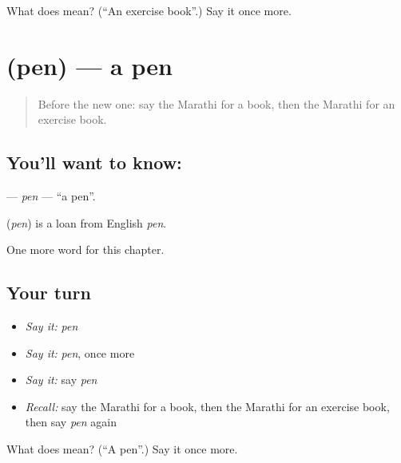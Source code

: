 \begin{tcolorbox}[breakable,colback=teal!4,colframe=teal!35!black,title={Before you move on}]
What does  mean? (\textquotedblleft{}An exercise book\textquotedblright{}.) Say it once more.
\end{tcolorbox}
\section[\texorpdfstring{\mr{पेन} (pen)}{पेन (pen)}]{ (pen) — a pen}

\label{lesson:MR-C93-pen}



\begin{quote}
Before the new one: say the Marathi for a book, then the Marathi for an exercise book.
\end{quote}

\subsection*{You'll want to know: }
\textbf{} — \emph{pen} — \textquotedblleft{}a pen\textquotedblright{}.

\begin{cousinweb}
\textbf{} (\emph{pen}) is a loan from English \emph{pen}.
\end{cousinweb}

\begin{grammarlens}[title={What you've built}]
One more word for this chapter.
\end{grammarlens}

\subsection*{Your turn}
\begin{itemize}
\raggedright
  \item \emph{Say it:} \emph{pen}
  \item \emph{Say it:} \emph{pen}, once more
  \item \emph{Say it:} say \emph{pen}
  \item \emph{Recall:} say the Marathi for a book, then the Marathi for an exercise book, then say \emph{pen} again
\end{itemize}

\begin{tcolorbox}[breakable,colback=teal!4,colframe=teal!35!black,title={Before you move on}]
What does  mean? (\textquotedblleft{}A pen\textquotedblright{}.) Say it once more.
\end{tcolorbox}
